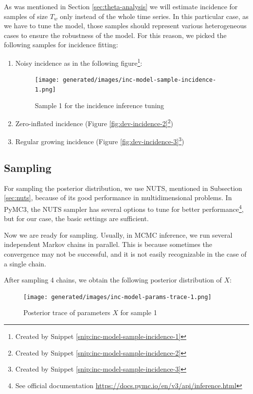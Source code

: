 \documentclass[
  digital, %
  oneside, %
  lof,     %
  lot,     %
]{fithesis4}
\begin{document}
As was mentioned in Section \ref{sec:theta-analysis} we will estimate incidence for samples of size $T_w$ only instead of the whole time series.
In this particular case, as we have to tune the model, those samples should represent various heterogeneous cases to ensure the robustness of the model.
For this reason, we picked the following samples for incidence fitting:

\begin{enumerate}
  \item Noisy incidence as in the following figure\footnote{Created by Snippet \ref{snip:inc-model-sample-incidence-1}}:
  \begin{figure}[H]
    \begin{center}
      \texttt{[image: generated/images/inc-model-sample-incidence-1.png]}
    \end{center}
    \caption{Sample 1 for the incidence inference tuning}
    \label{fig:dev-incidence-1}
  \end{figure}
  \item Zero-inflated incidence (Figure \ref{fig:dev-incidence-2}\footnote{Created by Snippet \ref{snip:inc-model-sample-incidence-2}})
  \item Regular growing incidence (Figure \ref{fig:dev-incidence-3}\footnote{Created by Snippet \ref{snip:inc-model-sample-incidence-3}})
\end{enumerate}


\subsection{Sampling}

For sampling the posterior distribution, we use NUTS, mentioned in Subsection \ref{sec:nuts}, because of its good performance in multidimensional problems.
In PyMC3, the NUTS sampler has several options to tune for better performance\footnote{See official documentation \url{https://docs.pymc.io/en/v3/api/inference.html}}, but for our case, the basic settings are sufficient.

Now we are ready for sampling.
Usually, in MCMC inference, we run several independent Markov chains in parallel.
This is because sometimes the convergence may not be successful, and it is not easily recognizable in the case of a single chain.

After sampling 4 chains, we obtain the following posterior distribution of $X$:

\begin{figure}[H]
  \begin{center}
    \texttt{[image: generated/images/inc-model-params-trace-1.png]}
  \end{center}
  \caption{Posterior trace of parameters $X$ for sample 1}
  \label{fig:params-trace-1}
\end{figure}
\end{document}
